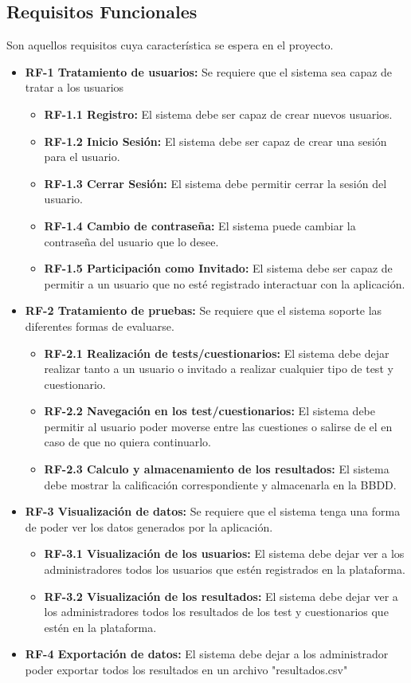 \subsection{Requisitos Funcionales}
Son aquellos requisitos cuya característica se espera en el proyecto.
\begin{itemize}
    \item \textbf{RF-1 Tratamiento de usuarios:} Se requiere que el sistema sea capaz de tratar a los usuarios
    \begin{itemize}
        \item \textbf{RF-1.1 Registro:} El sistema debe ser capaz de crear nuevos usuarios.
        \item \textbf{RF-1.2 Inicio Sesión:} El sistema debe ser capaz de crear una sesión  para el usuario.
        \item \textbf{RF-1.3 Cerrar Sesión:} El sistema debe permitir cerrar la sesión  del usuario.
        \item \textbf{RF-1.4 Cambio de contraseña:} El sistema puede cambiar la contraseña del usuario que lo desee.
        \item \textbf{RF-1.5 Participación como Invitado:} El sistema debe ser capaz de permitir a un usuario que no esté registrado interactuar con la aplicación.
    \end{itemize}
    \item \textbf{RF-2 Tratamiento de pruebas:} Se requiere que el sistema soporte las diferentes formas de evaluarse.
    \begin{itemize}
        \item \textbf{RF-2.1 Realización de tests/cuestionarios:} El sistema debe dejar realizar tanto a un usuario o invitado a realizar cualquier tipo de test y cuestionario.
        \item \textbf{RF-2.2 Navegación en los test/cuestionarios:} El sistema debe permitir al usuario poder moverse entre las cuestiones o salirse de el en caso de que no quiera continuarlo.
        \item \textbf{RF-2.3 Calculo y almacenamiento de los resultados:} El sistema debe mostrar la calificación correspondiente y almacenarla en la BBDD.
    \end{itemize}
    \item \textbf{RF-3 Visualización de datos:} Se requiere que el sistema tenga una forma de poder ver los datos generados por la aplicación.
    \begin{itemize}
        \item \textbf{RF-3.1 Visualización de los usuarios:} El sistema debe dejar ver a los administradores todos los usuarios que estén  registrados en la plataforma.
        \item \textbf{RF-3.2 Visualización de los resultados:} El sistema debe dejar ver a los administradores todos los resultados de los test y cuestionarios que estén  en la plataforma.
    \end{itemize}
    \item \textbf{RF-4 Exportación de datos:} El sistema debe dejar a los administrador poder exportar todos los resultados en un archivo "resultados.csv"
\end{itemize}
